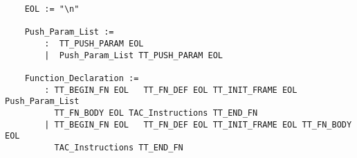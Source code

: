 \begin{verbatim}
	EOL := "\n"
	
	Push_Param_List :=
	    :  TT_PUSH_PARAM EOL
	    |  Push_Param_List TT_PUSH_PARAM EOL
	
	Function_Declaration :=
	    : TT_BEGIN_FN EOL	TT_FN_DEF EOL TT_INIT_FRAME EOL Push_Param_List
	      TT_FN_BODY EOL TAC_Instructions TT_END_FN
	    | TT_BEGIN_FN EOL	TT_FN_DEF EOL TT_INIT_FRAME EOL TT_FN_BODY EOL 
	      TAC_Instructions TT_END_FN
\end{verbatim}


